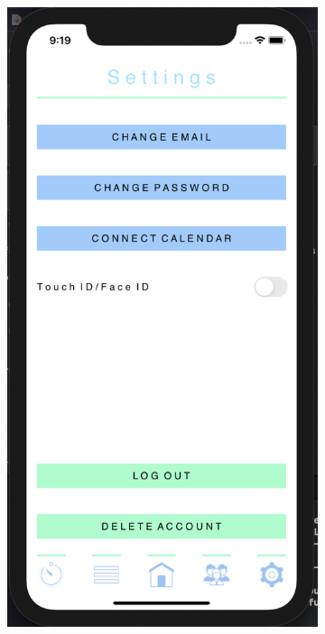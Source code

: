 \begin{figure}[H]
    \centering
    \begin{subfigure}[b]{0.3\textwidth}
        \centering
        \includegraphics[width=\textwidth]{./graphics/Implementation/Settings/settings.png}

\end{subfigure}
\end{figure}

